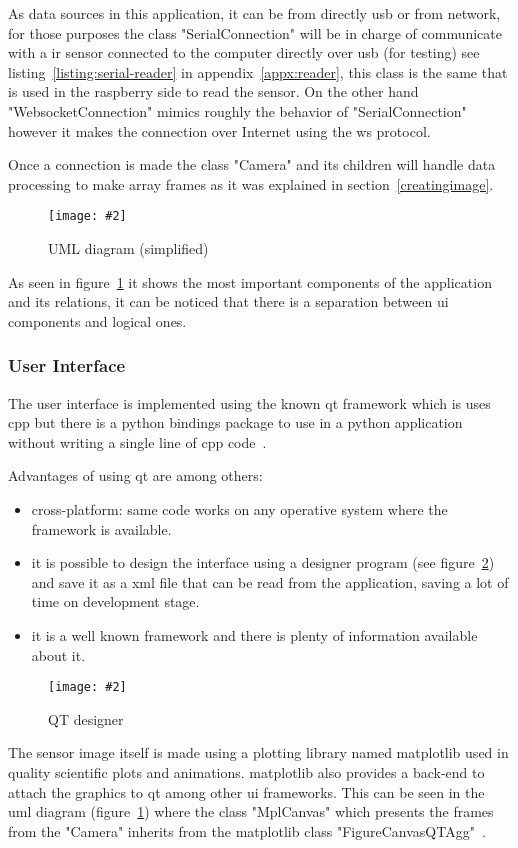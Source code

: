 \documentclass[hidelinks,11pt,a4paper,oneside,article]{memoir}
\newcommand{\putimage}[3][10] %
{
\begin{figure}[h]
	\centering
	\captionsetup{justification=centering}
	\texttt{[image: \#2]}
	\caption{#3}
	\label{fig:#2}
\end{figure}
}
\begin{document}
As data sources in this application, it can be from directly \gls{usb} or from network, for those purposes the class "SerialConnection" will be in charge of communicate with a \gls{ir} sensor connected to the computer directly over \gls{usb} (for testing) see listing~\ref{listing:serial-reader} in appendix~\ref{appx:reader}, this class is the same that is used in the raspberry side to read the sensor. On the other hand "WebsocketConnection" mimics roughly the behavior of "SerialConnection" however it makes the connection over Internet using the \gls{ws} protocol.

Once a connection is made the class "Camera" and its children will handle data processing to make array frames as it was explained in section~\ref{creatingimage}.

    \putimage[15]{python-uml}{UML diagram (simplified)}
    
As seen in figure~\ref{fig:python-uml} it shows the most important components of the application and its relations, it can be noticed that there is a separation between \gls{ui} components and logical ones.

\subsubsection{User Interface}
The user interface is implemented using the known \gls{qt} framework which is uses \gls{cpp} but there is a python bindings package to use in a python application without writing a single line of \gls{cpp} code~\cite{riverbank}.

Advantages of using qt are among others:
\begin{itemize}
    \item cross-platform: same code works on any operative system where the framework is available.
    \item it is possible to design the interface using a designer program (see figure~\ref{fig:qt-designer}) and save it as a \gls{xml} file that can be read from the application, saving a lot of time on development stage.
    \item it is a well known framework and there is plenty of information available about it.
\end{itemize}

    \putimage{qt-designer}{QT designer}

The sensor image itself is made using a plotting library named \gls{matplotlib} used in quality scientific plots and animations. \gls{matplotlib}  also provides a back-end to attach the graphics to \gls{qt} among other \gls{ui} frameworks. This can be seen in the \gls{uml} diagram (figure~\ref{fig:python-uml}) where the class "MplCanvas" which presents the frames from the "Camera" inherits from the \gls{matplotlib} class "FigureCanvasQTAgg"~\cite{matplotlibqt4agg}.
\end{document}
